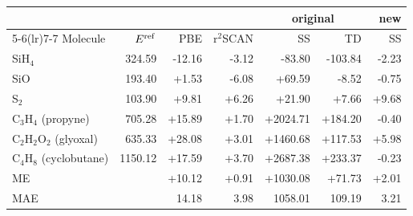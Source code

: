 \begin{tabular}{@{}l r rr rr r@{}}
\toprule
 & & & & \multicolumn{2}{c}{original} & new \\
\cmidrule(lr){5-6}\cmidrule(lr){7-7}
Molecule & $E^{\rm ref}$ & PBE & r$^2$SCAN & SS & TD & SS \\
\midrule
SiH$_4$ & 324.59 & \textcolor{pyscfred}{-12.16} & \textcolor{pyscfred}{-3.12} & \textcolor{pyscfred}{-83.80} & \textcolor{pyscfred}{-103.84} & \textcolor{pyscfred}{-2.23} \\
SiO & 193.40 & \textcolor{pyscfred}{+1.53} & \textcolor{pyscfred}{-6.08} & \textcolor{pyscfred}{+69.59} & \textcolor{pyscfred}{-8.52} & \textcolor{pyscfred}{-0.75} \\
S$_2$ & 103.90 & \textcolor{pyscfred}{+9.81} & \textcolor{pyscfred}{+6.26} & \textcolor{pyscfred}{+21.90} & \textcolor{pyscfred}{+7.66} & \textcolor{pyscfred}{+9.68} \\
C$_3$H$_4$ (propyne) & 705.28 & \textcolor{pyscfred}{+15.89} & \textcolor{pyscfred}{+1.70} & \textcolor{pyscfred}{+2024.71} & \textcolor{pyscfred}{+184.20} & \textcolor{pyscfred}{-0.40} \\
C$_2$H$_2$O$_2$ (glyoxal) & 635.33 & \textcolor{pyscfred}{+28.08} & \textcolor{pyscfred}{+3.01} & \textcolor{pyscfred}{+1460.68} & \textcolor{pyscfred}{+117.53} & \textcolor{pyscfred}{+5.98} \\
C$_4$H$_8$ (cyclobutane) & 1150.12 & \textcolor{pyscfred}{+17.59} & \textcolor{pyscfred}{+3.70} & \textcolor{pyscfred}{+2687.38} & \textcolor{pyscfred}{+233.37} & \textcolor{pyscfred}{-0.23} \\
\midrule
ME & & \textcolor{pyscfred}{+10.12} & \textcolor{pyscfred}{+0.91} & \textcolor{pyscfred}{+1030.08} & \textcolor{pyscfred}{+71.73} & \textcolor{pyscfred}{+2.01} \\
MAE & & \textcolor{pyscfred}{14.18} & \textcolor{pyscfred}{3.98} & \textcolor{pyscfred}{1058.01} & \textcolor{pyscfred}{109.19} & \textcolor{pyscfred}{3.21} \\
\bottomrule
\end{tabular}
